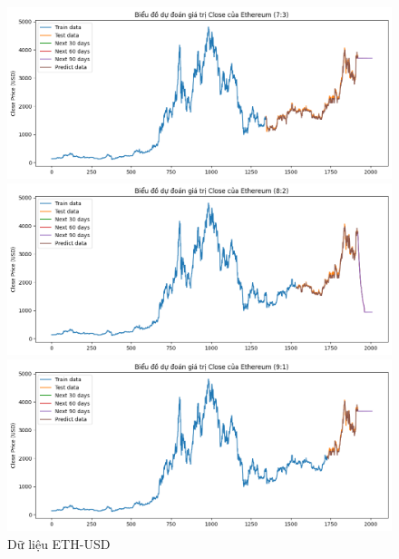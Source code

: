 \documentclass[conference]{IEEEtran}
\begin{document}
	\begin{figure}[H]
		\centering
		\begin{minipage}{0.15\textwidth}
			\centering
			\includegraphics[width=1\textwidth]{Figure/XGB_ETH_73.png}
		\end{minipage}
		\hfill
		\begin{minipage}{0.15\textwidth}
			\centering
			\includegraphics[width=1\textwidth]{Figure/XGB_ETH_82.png}
		\end{minipage}
		\hfill
		\begin{minipage}{0.15\textwidth}
			\centering
			\includegraphics[width=1\textwidth]{Figure/XGB_ETH_91.png}
		\end{minipage}
		\caption{Dữ liệu ETH-USD}
		\label{fig:1}
	\end{figure}
\end{document}
